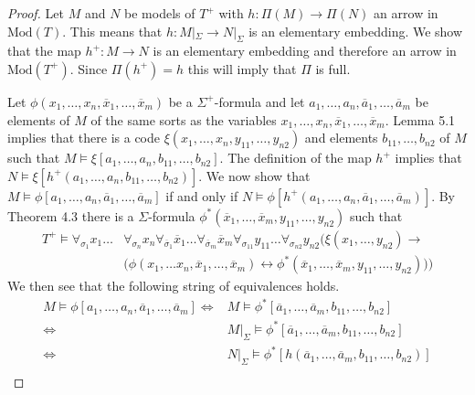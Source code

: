 \begin{proof}
  Let $M$ and $N$ be models of $T^+$ with $h:\Pi(M)\rightarrow\Pi(N)$
  an arrow in $\text{Mod}(T)$. This means that
  $h:M|_\Sigma\rightarrow N|_\Sigma$ is an elementary embedding. We
  show that the map $h^+:M\rightarrow N$ is an elementary embedding
  and therefore an arrow in $\text{Mod}(T^+)$. Since $\Pi(h^+)=h$ this
  will imply that $\Pi$ is full.

  Let $\phi(x_1,\ldots, x_n, \overline{x}_1,\ldots, \overline{x}_m)$
  be a $\Sigma^+$-formula and let
  $a_1,\ldots, a_n, \overline{a}_1,\ldots, \overline{a}_m$ be elements
  of $M$ of the same sorts as the variables
  $x_1,\ldots, x_n, \overline{x}_1,\ldots, \overline{x}_m$. Lemma 5.1
  implies that there is a code
  $\xi(x_1,\ldots, x_n, y_{11}, \ldots, y_{n2})$ and elements
  $b_{11},\ldots, b_{n2}$ of $M$ such that
  $M\vDash\xi[a_1,\ldots, a_n, b_{11}, \ldots, b_{n2}]$. The
  definition of the map $h^+$ implies that
  $N\vDash\xi[h^+(a_1,\ldots, a_n, b_{11}, \ldots, b_{n2})]$. We now
  show that
  $M\vDash\phi[a_1,\ldots, a_n, \overline{a}_1,\ldots,\overline{a}_m]$
  if and only if
  $N\vDash\phi[h^+(a_1,\ldots, a_n,
  \overline{a}_1,\ldots,\overline{a}_m)]$. By Theorem 4.3 there is a
  $\Sigma$-formula
  $\phi^*(\overline{x}_1,\ldots, \overline{x}_m,y_{11}, \ldots,
  y_{n2})$ such that
  \begin{equation}
\begin{aligned}
  T^+\vDash \forall_{\sigma_1} x_1\ldots&\forall_{\sigma_n} x_n\forall_{\overline{\sigma}_1} \overline{x}_1\ldots\forall_{\overline{\sigma}_m}\overline{x}_m\forall_{\sigma_{11}} y_{11}\ldots\forall_{\sigma_{n2}} y_{n2}\big(\xi(x_1,\ldots, y_{n2})\rightarrow\\
  &\big(\phi(x_1,\ldots x_n, \overline{x}_1,\ldots,
  \overline{x}_m)\leftrightarrow\phi^*(\overline{x}_1,\ldots,\overline{x}_m,
  y_{11},\ldots, y_{n2})\big)\big)
\end{aligned}
\end{equation}
We then see that the following string of equivalences holds.
\begin{align*}
M\vDash \phi[a_1,\ldots, a_n, \overline{a}_1,\ldots, \overline{a}_m]
\Longleftrightarrow& M\vDash \phi^*[\overline{a}_1,\ldots, \overline{a}_m, b_{11},\ldots, b_{n2}]\\
\Longleftrightarrow& M|_\Sigma\vDash\phi^*[\overline{a}_1,\ldots, \overline{a}_m, b_{11},\ldots, b_{n2}]\\
\Longleftrightarrow& N|_\Sigma\vDash\phi^*[h(\overline{a}_1,\ldots, \overline{a}_m, b_{11},\ldots, b_{n2})]\\

\end{align*}
\end{proof}
